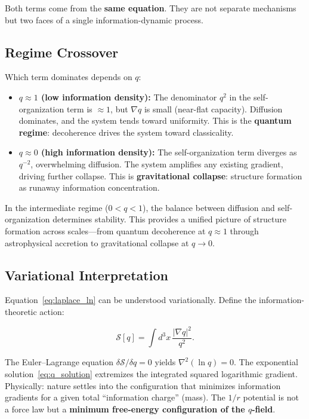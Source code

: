 \documentclass[aps,prd,twocolumn,showpacs,superscriptaddress,preprintnumbers]{revtex4-2}
\begin{document}
Both terms come from the \textbf{same equation}.
They are not separate mechanisms but two faces of a single information-dynamic process.

\subsection{Regime Crossover}

Which term dominates depends on $q$:

\begin{itemize}
    \item \textbf{$q\approx1$ (low information density):} The denominator $q^2$ in the self-organization term is $\approx1$, but $\nabla q$ is small (near-flat capacity). Diffusion dominates, and the system tends toward uniformity. This is the \textbf{quantum regime}: decoherence drives the system toward classicality.

    \item \textbf{$q\approx0$ (high information density):} The self-organization term diverges as $q^{-2}$, overwhelming diffusion. The system amplifies any existing gradient, driving further collapse. This is \textbf{gravitational collapse}: structure formation as runaway information concentration.
\end{itemize}

In the intermediate regime ($0<q<1$), the balance between diffusion and self-organization determines stability.
This provides a unified picture of structure formation across scales---from quantum decoherence at $q\approx1$ through astrophysical accretion to gravitational collapse at $q\to0$.

\subsection{Variational Interpretation}

Equation~\eqref{eq:laplace_ln} can be understood variationally.
Define the information-theoretic action:

\begin{equation}
\mathcal{S}[q] = \int d^3x \, \frac{|\nabla q|^2}{q^2}.
\label{eq:action}
\end{equation}

The Euler--Lagrange equation $\delta\mathcal{S}/\delta q=0$ yields $\nabla^2(\ln q)=0$.
The exponential solution~\eqref{eq:q_solution} extremizes the integrated squared logarithmic gradient.
Physically: nature settles into the configuration that minimizes information gradients for a given total ``information charge'' (mass).
The $1/r$ potential is not a force law but a \textbf{minimum free-energy configuration of the $q$-field}.
\end{document}
